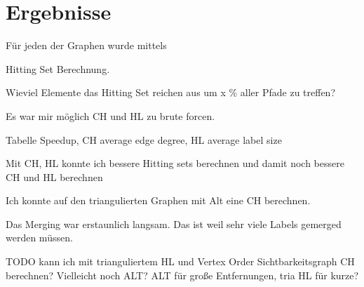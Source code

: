 \chapter{Ergebnisse}




Für jeden der Graphen wurde mittels

Hitting Set Berechnung.


Wieviel Elemente das Hitting Set reichen aus um x \% aller Pfade zu treffen?


Es war mir möglich CH und HL zu brute forcen.

Tabelle Speedup, CH average edge degree, HL average label size

Mit CH, HL konnte ich bessere Hitting sets berechnen und damit noch bessere CH und HL  berechnen



Ich konnte auf den triangulierten Graphen mit Alt eine CH berechnen.



Das Merging war erstaunlich langsam. Das ist weil sehr viele Labels gemerged werden müssen.


TODO kann ich mit trianguliertem HL und Vertex Order Sichtbarkeitsgraph CH berechnen?
Vielleicht noch ALT? ALT für große Entfernungen, tria HL für kurze?